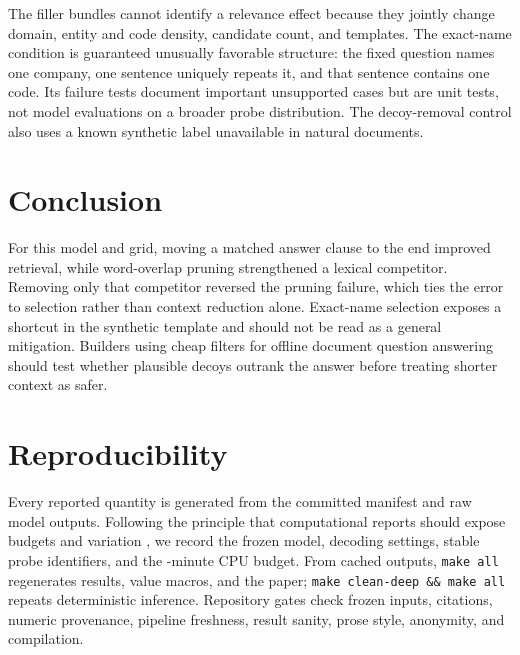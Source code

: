 \documentclass{article}
\begin{document}
The filler bundles cannot identify a relevance effect because they jointly change domain, entity and code density, candidate count, and templates. The exact-name condition is guaranteed unusually favorable structure: the fixed question names one company, one sentence uniquely repeats it, and that sentence contains one code. Its failure tests document important unsupported cases but are unit tests, not model evaluations on a broader probe distribution. The decoy-removal control also uses a known synthetic label unavailable in natural documents.

\section{Conclusion}

For this model and grid, moving a matched answer clause to the end improved retrieval, while word-overlap pruning strengthened a lexical competitor. Removing only that competitor reversed the pruning failure, which ties the error to selection rather than context reduction alone. Exact-name selection exposes a shortcut in the synthetic template and should not be read as a general mitigation. Builders using cheap filters for offline document question answering should test whether plausible decoys outrank the answer before treating shorter context as safer.

\section{Reproducibility}

Every reported quantity is generated from the committed manifest and raw model outputs. Following the principle that computational reports should expose budgets and variation \citep{dodge2019show}, we record the frozen model, decoding settings, stable probe identifiers, and the \cpuBudgetMinutes{}-minute CPU budget. From cached outputs, \texttt{make all} regenerates results, value macros, and the paper; \texttt{make clean-deep \&\& make all} repeats deterministic inference. Repository gates check frozen inputs, citations, numeric provenance, pipeline freshness, result sanity, prose style, anonymity, and compilation.

\label{main-body-end}


\end{document}

